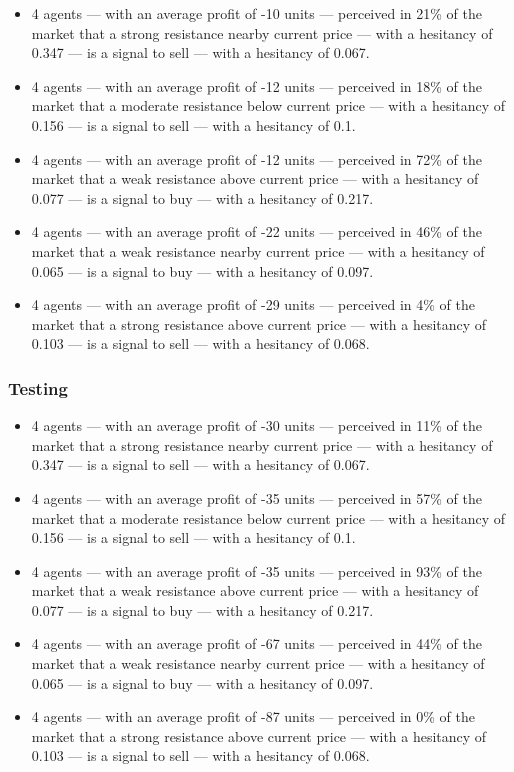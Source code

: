 {\scriptsize
  \begin{itemize}
    \item 4 agents — with an average profit of -10 units — perceived in 21\% of
      the market that a strong resistance nearby current price — with a
      hesitancy of 0.347 — is a signal to sell — with a hesitancy of 0.067.
\item 4 agents — with an average profit of -12 units — perceived in 18\% of the
  market that a moderate resistance below current price — with a hesitancy of
  0.156 — is a signal to sell — with a hesitancy of 0.1.
\item 4 agents — with an average profit of -12 units — perceived in 72\% of the
  market that a weak resistance above current price — with a hesitancy of 0.077
  — is a signal to buy — with a hesitancy of 0.217.
\item 4 agents — with an average profit of -22 units — perceived in 46\% of the
  market that a weak resistance nearby current price — with a hesitancy of 0.065
  — is a signal to buy — with a hesitancy of 0.097.
\item 4 agents — with an average profit of -29 units — perceived in 4\% of the
  market that a strong resistance above current price — with a hesitancy of
  0.103 — is a signal to sell — with a hesitancy of 0.068.
  \end{itemize}
}

\subsubsection{Testing}
\label{}

{\scriptsize
  \begin{itemize}
    \item 4 agents — with an average profit of -30 units — perceived in 11\% of
      the market that a strong resistance nearby current price — with a
      hesitancy of 0.347 — is a signal to sell — with a hesitancy of 0.067.
\item 4 agents — with an average profit of -35 units — perceived in 57\% of the
  market that a moderate resistance below current price — with a hesitancy of
  0.156 — is a signal to sell — with a hesitancy of 0.1.
\item 4 agents — with an average profit of -35 units — perceived in 93\% of the
  market that a weak resistance above current price — with a hesitancy of 0.077
  — is a signal to buy — with a hesitancy of 0.217.
\item 4 agents — with an average profit of -67 units — perceived in 44\% of the
  market that a weak resistance nearby current price — with a hesitancy of 0.065
  — is a signal to buy — with a hesitancy of 0.097.
\item 4 agents — with an average profit of -87 units — perceived in 0\% of the
  market that a strong resistance above current price — with a hesitancy of
  0.103 — is a signal to sell — with a hesitancy of 0.068.
  \end{itemize}
}





